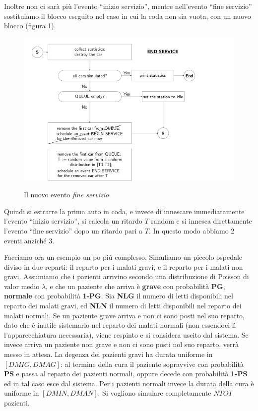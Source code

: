 \documentclass[11pt]{book}
\begin{document}
Inoltre non ci sar\`a pi\`u l'evento ``inizio servizio'', mentre
nell'evento ``fine servizio'' sostituiamo il blocco eseguito nel caso
in cui la coda non sia vuota, con un nuovo blocco (figura
\ref{cap11fig12}).

\begin{figure}[H]
  \centering
  \includegraphics[width=\textwidth]{images/cap11fig12.png}
  \label{cap11fig12}
  \caption{Il nuovo evento {\em fine servizio}}
\end{figure}

Quindi si estrarre la prima auto in coda, e invece di innescare
immediatamente l'evento ``inizio servizio'', si calcola un ritardo $T$
random e si innesca direttamente l'evento ``fine servizio'' dopo un
ritardo pari a $T$. In questo modo abbiamo 2 eventi anzich\'e 3.

\par\bigskip

Facciamo ora un esempio un po pi\`u complesso. Simuliamo un piccolo
ospedale diviso in due reparti: il reparto per i malati gravi, e il
reparto per i malati non gravi. Assumiamo che i pazienti arrivino
secondo una distribuzione di Poisson di valor medio $\lambda$, e che
un paziente che arriva \`e {\bf grave} con probabilit\`a {\bf PG},
{\bf normale} con probabilit\`a {\bf 1-PG}. Sia {\bf NLG} il numero di
letti disponibili nel reparto dei malati gravi, ed {\bf NLN} il numero
di letti disponibili nel reparto dei malati normali. Se un paziente
grave arriva e non ci sono posti nel suo reparto, dato che \`e inutile
sistemarlo nel reparto dei malati normali (non essendoci l\`i
l'apparecchiatura necessaria), viene respinto e si considera uscito
dal sistema. Se invece arriva un paziente non grave e non ci sono
posti nol suo reparto, verr\`a messo in attesa. La degenza dei
pazienti gravi ha durata uniforme in $[DMIG,DMAG]$: al termine della
cura il paziente sopravvive con probabilit\`a {\bf PS} e passa al
reparto dei pazienti normali, oppure decede con probabilit\`a {\bf
  1-PS} ed in tal caso esce dal sistema. Per i pazienti normali invece
la durata della cura \`e uniforme in $[DMIN,DMAN]$. Si vogliono
simulare completamente $NTOT$ pazienti.
\end{document}
